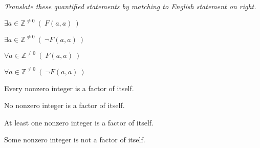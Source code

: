 
{\it Translate these quantified statements by matching to English statement on right.}

\begin{multicols}{2}
$\exists a\in \mathbb{Z}^{\neq 0} ~(~F(a,a)~)$

$\exists a\in \mathbb{Z}^{\neq 0} ~(~\lnot F(a,a)~)$

$\forall a\in \mathbb{Z}^{\neq 0} ~(~F(a,a)~)$

$\forall a\in \mathbb{Z}^{\neq 0} ~(~\lnot F(a,a)~)$


Every nonzero integer is a factor of itself.

No nonzero integer is a factor of itself.

At least one nonzero integer is a factor of itself.

Some nonzero integer is not a factor of itself.
\end{multicols}